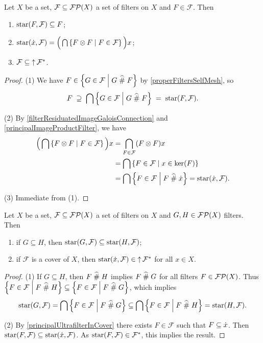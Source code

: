 \begin{lemma} \label{starRefinementLemma}
Let $X$ be a set, $\mathcal{F} \subseteq \operatorname{\mathcal{FP}}(X)$ a set of filters on $X$ and $F\in \mathcal{F}$. Then
\begin{enumerate}
\item $\operatorname{star}(F,\mathcal{F}) \subseteq F$;
\item $\operatorname{star}(\dot{x}, \mathcal{F}) = \Big(\bigcap\left\{ F\otimes F \;\middle|\; F\in\mathcal{F} \right\}\Big)x$;
\item $\mathcal{F} \subseteq \operatorname{\uparrow}\mathcal{F}^*$.
\end{enumerate}
\end{lemma}
\begin{proof}
(1) We have $F\in \left\{ G\in \mathcal{F} \;\middle|\; G \mathrel{\widehat{\#}} F \right\}$ by \ref{properFiltersSelfMesh}, so
\[ F \;\supseteq\; \bigcap \left\{ G\in \mathcal{F} \;\middle|\; G \mathrel{\widehat{\#}} F \right\} \;=\; \operatorname{star}(F,\mathcal{F}). \]

(2) By \ref{filterResiduatedImageGaloisConnection} and \ref{principalImageProductFilter}, we have
\begin{align*}
\Big(\bigcap\left\{ F\otimes F \;\middle|\; F\in\mathcal{F} \right\}\Big)x &= \bigcap_{F\in\mathcal{F}}(F\otimes F)x \\
&= \bigcap \left\{ F\in\mathcal{F} \;\middle|\; x\in\ker(F) \right\} \\
&= \bigcap \left\{ F\in\mathcal{F} \;\middle|\; F\mathrel{\widehat{\#}}\dot{x} \right\} = \operatorname{star}(\dot{x}, \mathcal{F}).
\end{align*}

(3) Immediate from (1).
\end{proof}

\begin{lemma} \label{starFilterOrderingLemma}
Let $X$ be a set, $\mathcal{F} \subseteq \operatorname{\mathcal{FP}}(X)$ a set of filters on $X$ and $G,H\in \operatorname{\mathcal{FP}}(X)$ filters. Then
\begin{enumerate}
\item if $G\subseteq H$, then $\operatorname{star}(G,\mathcal{F}) \subseteq \operatorname{star}(H,\mathcal{F})$;
\item if $\mathcal{F}$ is a cover of $X$, then $\operatorname{star}(\dot{x}, \mathcal{F}) \in \operatorname{\uparrow} \mathcal{F}^*$ for all $x\in X$.
\end{enumerate}
\end{lemma}
\begin{proof}
(1) If $G\subseteq H$, then $F\mathrel{\widehat{\#}} H$ implies $F\mathrel{\widehat{\#}} G$ for all filters $F\in\operatorname{\mathcal{FP}}(X)$. Thus $\left\{ F\in\mathcal{F} \;\middle|\; F\mathrel{\widehat{\#}} H \right\} \subseteq \left\{ F\in\mathcal{F} \;\middle|\; F\mathrel{\widehat{\#}} G \right\}$, which implies
\[ \operatorname{star}(G,\mathcal{F}) = \bigcap\left\{ F\in\mathcal{F} \;\middle|\; F\mathrel{\widehat{\#}} G \right\} \subseteq \bigcap\left\{ F\in\mathcal{F} \;\middle|\; F\mathrel{\widehat{\#}} H \right\} = \operatorname{star}(H,\mathcal{F}). \]

(2) By \ref{principalUltrafilterInCover} there exists $F\in \mathcal{F}$ such that $F\subseteq \dot{x}$. Then $\operatorname{star}(F, \mathcal{F}) \subseteq \operatorname{star}(\dot{x}, \mathcal{F})$. As $\operatorname{star}(F, \mathcal{F}) \in \mathcal{F}^*$, this implies the result.
\end{proof}

